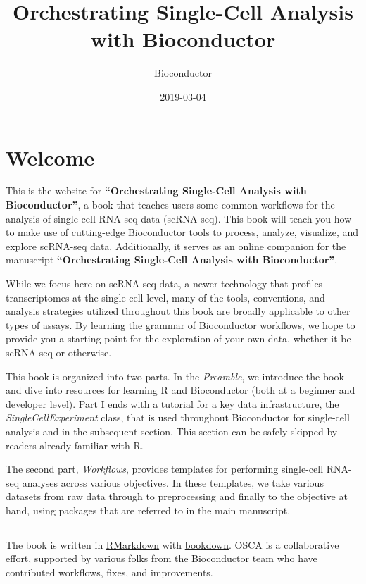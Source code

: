 \documentclass[]{book}
\title{Orchestrating Single-Cell Analysis with Bioconductor}
\author{Bioconductor}
\date{2019-03-04}
\begin{document}
\maketitle

{
\setcounter{tocdepth}{1}
\tableofcontents
}
\hypertarget{welcome}{%
\chapter*{Welcome}\label{welcome}}

This is the website for \textbf{``Orchestrating Single-Cell Analysis with Bioconductor''}, a book that teaches users some common workflows for the analysis of single-cell RNA-seq data (scRNA-seq). This book will teach you how to make use of cutting-edge Bioconductor tools to process, analyze, visualize, and explore scRNA-seq data. Additionally, it serves as an online companion for the manuscript \textbf{``Orchestrating Single-Cell Analysis with Bioconductor''}.

While we focus here on scRNA-seq data, a newer technology that profiles transcriptomes at the single-cell level, many of the tools, conventions, and analysis strategies utilized throughout this book are broadly applicable to other types of assays. By learning the grammar of Bioconductor workflows, we hope to provide you a starting point for the exploration of your own data, whether it be scRNA-seq or otherwise.

This book is organized into two parts. In the \emph{Preamble}, we introduce the book and dive into resources for learning R and Bioconductor (both at a beginner and developer level). Part I ends with a tutorial for a key data infrastructure, the \emph{SingleCellExperiment} class, that is used throughout Bioconductor for single-cell analysis and in the subsequent section. This section can be safely skipped by readers already familiar with R.

The second part, \emph{Workflows}, provides templates for performing single-cell RNA-seq analyses across various objectives. In these templates, we take various datasets from raw data through to preprocessing and finally to the objective at hand, using packages that are referred to in the main manuscript.

\begin{center}\rule{0.5\linewidth}{\linethickness}\end{center}

The book is written in \href{https://rmarkdown.rstudio.com}{RMarkdown} with \href{https://bookdown.org}{bookdown}. OSCA is a collaborative effort, supported by various folks from the Bioconductor team who have contributed workflows, fixes, and improvements.
\end{document}
